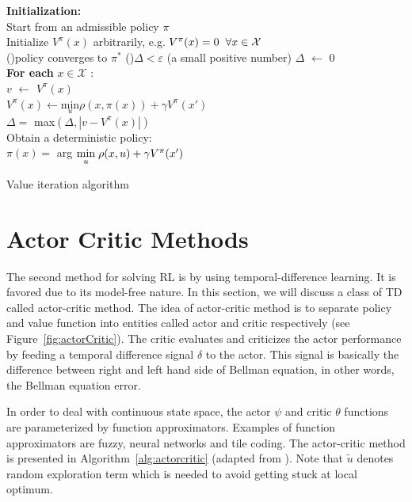 \begin{algorithm}
	\textbf{Initialization:} \\
	Start from an admissible policy $ \pi $\\
	Initialize $V^{\pi}(x)$ arbitrarily, e.g. $ V^{\pi}(x) = 0 \hspace{2mm}  \forall x \in \mathcal{X} $ \\
	\Repeat(){policy converges to $ \pi^* $}{
		\Repeat(){$ \Delta  <  \varepsilon $ (a small positive number)}{
			$ \Delta $ $ \leftarrow $ 0 \\
			\textbf{For each} $ x \in \mathcal{X} $ :\\
			\hspace{5mm} $ v $ $ \leftarrow $ $ V^{\pi}(x) $ \\
			\hspace{5mm} $ V^{\pi}(x) \leftarrow \underset{u}{\text{min}} \rho(x, \pi(x)) + \gamma V^{\pi}(x') $ \\
			\hspace{5mm} $ \Delta = $ max$ (\Delta, |v-V^{\pi}(x)|) $ \\}
		\vspace{2mm}
		Obtain a deterministic policy: \\
		$ \pi(x)=$  arg $\underset{u}{\text{min}} \hspace{1mm} \rho(x, u) +\gamma V^{\pi}(x') $  \\

	}
	\caption{Value iteration algorithm}
\label{alg:VI}
\end{algorithm}

 
\section{Actor Critic Methods} \label{sec:actor}
The second method for solving \ac{RL} is by using temporal-difference learning. It is favored due to its model-free nature. In this section, we will discuss a class of \ac{TD} called actor-critic method. The idea of actor-critic method is to separate policy and value function into entities called actor and critic respectively (see Figure~\ref{fig:actorCritic}). The critic evaluates and criticizes the actor performance by feeding a temporal difference signal $\delta$ to the actor. This signal is basically the difference between right and left hand side of Bellman equation, in other words, the Bellman equation error. 

In order to deal with continuous state space, the actor $\psi$ and critic $\theta$ functions are parameterized by function approximators. Examples of function approximators are fuzzy, neural networks and tile coding. The actor-critic method is presented in Algorithm~\ref{alg:actorcritic} (adapted from \cite{babuskaRL}). Note that $\tilde{u}$ denotes random exploration term which is needed to avoid getting stuck at local optimum.

